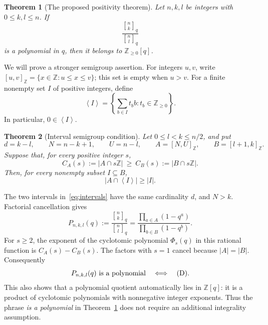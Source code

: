 \documentclass[11pt,a4paper]{article}
\numberwithin{equation}{section}
\newtheorem{theorem}{Theorem}[section]
\theoremstyle{remark}
\newcommand{\Z}{\mathbb Z}
\newcommand{\Nzero}{\mathbb Z_{\ge 0}}
\newcommand{\sg}[1]{\left\langle #1\right\rangle}
\newcommand{\qbinom}[2]{\genfrac{[}{]}{0pt}{}{#1}{#2}_{q}}
\newcommand{\Dcond}{\textup{(D)}}
\newcommand{\interval}[2]{[#1,#2]_{\Z}}
\begin{document}
\begin{theorem}[The proposed positivity theorem]\label{thm:main}
Let $n,k,l$ be integers with $0\le k,l\le n$. If
\begin{equation}\label{eq:mainquotient}
  \frac{\qbinom{n}{k}}{\qbinom{n}{l}}
\end{equation}
is a polynomial in $q$, then it belongs to $\Nzero[q]$.
\end{theorem}

We will prove a stronger semigroup assertion. For integers $u,v$, write
$\interval{u}{v}=\{x\in\Z:u\le x\le v\}$; this set is empty when $u>v$.
For a finite nonempty set $I$ of positive integers, define
\begin{equation}\label{eq:semigroup}
  \sg{I}=\left\{\sum_{b\in I} t_b b:t_b\in\Nzero\right\}.
\end{equation}
In particular, $0\in\sg{I}$.

\begin{theorem}[Interval semigroup condition]\label{thm:hitting}
Let $0\le l<k\le n/2$, and put
\begin{equation}\label{eq:intervals}
  d=k-l,\qquad N=n-k+1,\qquad U=n-l,\qquad
  A=\interval{N}{U},\qquad B=\interval{l+1}{k}.
\end{equation}
Suppose that, for every positive integer $s$,
\begin{equation}\tag{D}\label{eq:D}
  C_A(s):=|A\cap s\Z|\ \ge\ C_B(s):=|B\cap s\Z|.
\end{equation}
Then, for every nonempty subset $I\subseteq B$,
\begin{equation}\tag{H}\label{eq:H}
  |A\cap\sg{I}|\ge |I|.
\end{equation}
\end{theorem}

The two intervals in~\eqref{eq:intervals} have the same cardinality $d$,
and $N>k$. Factorial cancellation gives
\begin{equation}\label{eq:cancel}
  P_{n,k,l}(q):=
  \frac{\qbinom{n}{k}}{\qbinom{n}{l}}
  =\frac{\prod_{a\in A}(1-q^a)}
         {\prod_{b\in B}(1-q^b)}.
\end{equation}
For $s\ge2$, the exponent of the cyclotomic polynomial $\Phi_s(q)$ in
this rational function is $C_A(s)-C_B(s)$. The factors with $s=1$
cancel because $|A|=|B|$. Consequently
\begin{equation}\label{eq:polynomialcriterion}
  P_{n,k,l}(q)\text{ is a polynomial}
  \quad\Longleftrightarrow\quad \Dcond.
\end{equation}
This also shows that a polynomial quotient automatically lies in
$\Z[q]$: it is a product of cyclotomic polynomials with nonnegative
integer exponents. Thus the phrase \emph{is a polynomial} in
Theorem~\ref{thm:main} does not require an additional integrality
assumption.
\end{document}

